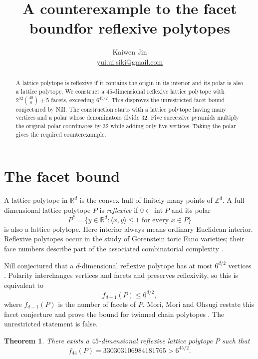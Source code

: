 \documentclass[11pt]{article}
\title{A counterexample to the facet bound\newline for reflexive polytopes}
\author{Kaiwen Jin\\[2pt]\small\href{mailto:yui.ui.siki@gmail.com}{yui.ui.siki@gmail.com}}
\date{}
\newtheorem{theorem}{Theorem}
\newcommand{\inte}{\operatorname{int}}
\begin{document}
\maketitle

\begin{abstract}
A lattice polytope is reflexive if it contains the origin in its interior
and its polar is also a lattice polytope.
We construct a $45$-dimensional reflexive lattice polytope with
$2^{32}\binom{40}{8}+5$ facets, exceeding $6^{45/2}$.
This disproves the unrestricted facet bound conjectured by Nill.
The construction starts with a lattice polytope having many vertices and
a polar whose denominators divide $32$. Five successive pyramids multiply
the original polar coordinates by $32$ while adding only five vertices.
Taking the polar gives the required counterexample.
\end{abstract}

\section{The facet bound}

A lattice polytope in $\mathbb R^d$ is the convex hull of finitely many
points of $\mathbb Z^d$. A full-dimensional lattice polytope $P$ is
\emph{reflexive} if $0\in\inte P$ and its polar
\[
 P^*=\{y\in\mathbb R^d:\langle x,y\rangle\leq1
                         \text{ for every }x\in P\}
\]
is also a lattice polytope. Here interior always means ordinary Euclidean
interior. Reflexive polytopes occur in the study of Gorenstein toric Fano
varieties; their face numbers describe part of the associated combinatorial
complexity \cite{Nill}.

Nill conjectured that a $d$-dimensional reflexive polytope has at most
$6^{d/2}$ vertices \cite[Conjecture~5.2]{Nill}. Polarity interchanges vertices
and facets and preserves reflexivity, so this is equivalent to
\begin{equation}\label{eq:bound}
 f_{d-1}(P)\leq6^{d/2},
\end{equation}
where $f_{d-1}(P)$ is the number of facets of $P$.
Mori, Mori and Ohsugi restate this facet conjecture and prove the bound for
twinned chain polytopes \cite[Conjecture~1.1 and Theorem~1.2]{MMO}.
The unrestricted statement is false.

\begin{theorem}\label{thm:main}
There exists a $45$-dimensional reflexive lattice polytope $P$ such that
\[
 f_{44}(P)=330303106984181765>6^{45/2}.
\]
\end{theorem}
\end{document}
